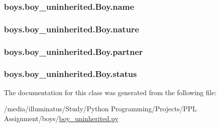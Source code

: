 \subsubsection[{\texorpdfstring{name}{name}}]{\setlength{\rightskip}{0pt plus 5cm}boys.\+boy\+\_\+uninherited.\+Boy.\+name}\hypertarget{classboys_1_1boy__uninherited_1_1_boy_a4009413656c9d8057fc54545dce28df8}{}\label{classboys_1_1boy__uninherited_1_1_boy_a4009413656c9d8057fc54545dce28df8}
\subsubsection[{\texorpdfstring{nature}{nature}}]{\setlength{\rightskip}{0pt plus 5cm}boys.\+boy\+\_\+uninherited.\+Boy.\+nature}\hypertarget{classboys_1_1boy__uninherited_1_1_boy_aea7eb7c4e32a8490a7280a8cb99f036d}{}\label{classboys_1_1boy__uninherited_1_1_boy_aea7eb7c4e32a8490a7280a8cb99f036d}
\subsubsection[{\texorpdfstring{partner}{partner}}]{\setlength{\rightskip}{0pt plus 5cm}boys.\+boy\+\_\+uninherited.\+Boy.\+partner}\hypertarget{classboys_1_1boy__uninherited_1_1_boy_aa70bd494f431eff2fad089ac5ccf9403}{}\label{classboys_1_1boy__uninherited_1_1_boy_aa70bd494f431eff2fad089ac5ccf9403}
\subsubsection[{\texorpdfstring{status}{status}}]{\setlength{\rightskip}{0pt plus 5cm}boys.\+boy\+\_\+uninherited.\+Boy.\+status}\hypertarget{classboys_1_1boy__uninherited_1_1_boy_a54bb9865e7dfb35e804b976d2d94a174}{}\label{classboys_1_1boy__uninherited_1_1_boy_a54bb9865e7dfb35e804b976d2d94a174}


The documentation for this class was generated from the following file\+:\begin{DoxyCompactItemize}
\item 
/media/illuminatus/\+Study/\+Python Programming/\+Projects/\+P\+P\+L Assignment/boys/\hyperlink{boy__uninherited_8py}{boy\+\_\+uninherited.\+py}\end{DoxyCompactItemize}
